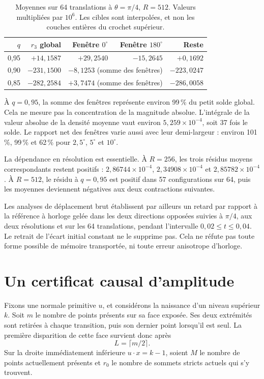 \documentclass[11pt,a4paper]{article}
\newcommand{\sci}[2]{#1\times10^{#2}}
\begin{document}
\begin{table}[h]
\centering\small
\caption{Moyennes sur 64 translations à $\theta=\pi/4$, $R=512$. Valeurs multipliées par $10^6$. Les cibles sont interpolées, et non les couches entières du crochet supérieur.}
\begin{tabular}{rrrrr}\toprule
$q$ & $r_3$ global & Fenêtre $0^\circ$ & Fenêtre $180^\circ$ & Reste\\\midrule
0,95 & $+14{,}1587$ & $+29{,}2540$ & $-15{,}2645$ & $+0{,}1692$\\
0,90 & $-231{,}1500$ & \multicolumn{2}{c}{$-8{,}1253$ (somme des fenêtres)} & $-223{,}0247$\\
0,85 & $-282{,}2584$ & \multicolumn{2}{c}{$+3{,}7474$ (somme des fenêtres)} & $-286{,}0058$\\\bottomrule
\end{tabular}
\end{table}

À $q=0{,}95$, la somme des fenêtres représente environ 99\,\% du petit solde global. Cela ne mesure pas la concentration de la magnitude absolue. L'intégrale de la valeur absolue de la densité moyenne vaut environ $\sci{5{,}259}{-4}$, soit 37 fois le solde. Le rapport net des fenêtres varie aussi avec leur demi-largeur : environ 101\,\%, 99\,\% et 62\,\% pour $2{,}5^\circ$, $5^\circ$ et $10^\circ$.

La dépendance en résolution est essentielle. À $R=256$, les trois résidus moyens correspondants restent positifs : $\sci{2{,}86744}{-4}$, $\sci{2{,}34908}{-4}$ et $\sci{2{,}85782}{-4}$. À $R=512$, le résidu à $q=0{,}95$ est positif dans 57 configurations sur 64, puis les moyennes deviennent négatives aux deux contractions suivantes.

Les analyses de déplacement brut établissent par ailleurs un retard par rapport à la référence à horloge gelée dans les deux directions opposées suivies à $\pi/4$, aux deux résolutions et sur les 64 translations, pendant l'intervalle $0{,}02\le t\le0{,}04$. Le retrait de l'écart initial constant ne le supprime pas. Cela ne réfute pas toute forme possible de mémoire transportée, ni toute erreur anisotrope d'horloge.

\newpage
\section{Un certificat causal d'amplitude}
Fixons une normale primitive $u$, et considérons la naissance d'un niveau supérieur $k$. Soit $m$ le nombre de points présents sur sa face exposée. Ses deux extrémités sont retirées à chaque transition, puis son dernier point lorsqu'il est seul. La première disparition de cette face survient donc après
\begin{equation} L=\lceil m/2\rceil.\end{equation}
Sur la droite immédiatement inférieure $u\cdot x=k-1$, soient $M$ le nombre de points actuellement présents et $r_0$ le nombre de sommets stricts actuels qui s'y trouvent.
\end{document}
